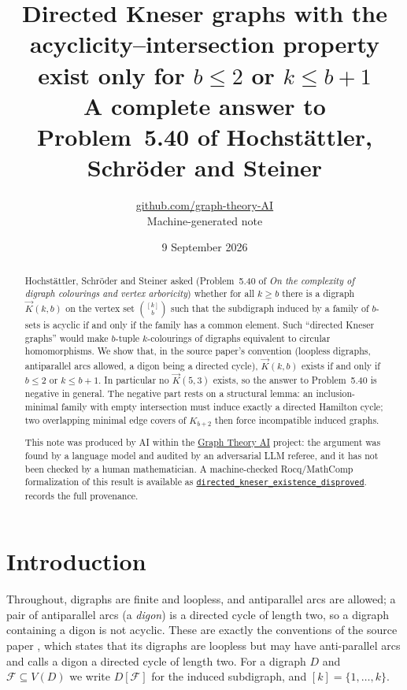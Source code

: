 \documentclass[11pt,a4paper]{article}
\title{Directed Kneser graphs with the acyclicity--intersection property\\ exist only for $b\le2$ or $k\le b+1$\\[1ex] \large A complete answer to Problem~5.40 of Hochstättler, Schröder and Steiner}
\author{\href{https://github.com/graph-theory-AI}{github.com/graph-theory-AI}\\[2pt] \normalsize Machine-generated note}
\date{9 September 2026}
\theoremstyle{plain}
\theoremstyle{definition}
\theoremstyle{remark}
\newcommand{\dK}{\vec{K}}
\newcommand{\cF}{\mathcal F}
\begin{document}
\maketitle


\begin{abstract}
Hochstättler, Schröder and Steiner asked (Problem~5.40 of \emph{On the complexity of digraph colourings and vertex arboricity}) whether for all $k\ge b$ there is a digraph $\dK(k,b)$ on the vertex set $\binom{[k]}{b}$ such that the subdigraph induced by a family of $b$-sets is acyclic if and only if the family has a common element. Such ``directed Kneser graphs'' would make $b$-tuple $k$-colourings of digraphs equivalent to circular homomorphisms. We show that, in the source paper's convention (loopless digraphs, antiparallel arcs allowed, a digon being a directed cycle), $\dK(k,b)$ exists if and only if $b\le2$ or $k\le b+1$. In particular no $\dK(5,3)$ exists, so the answer to Problem~5.40 is negative in general. The negative part rests on a structural lemma: an inclusion-minimal family with empty intersection must induce exactly a directed Hamilton cycle; two overlapping minimal edge covers of $K_{b+2}$ then force incompatible induced graphs.

\medskip\noindent\small
This note was produced by AI within the \href{https://github.com/graph-theory-AI/Graph-Theory-LLM-Proofs}{Graph Theory AI} project:
the argument was found by a language model and audited by an adversarial LLM
referee, and it has not been checked by a human mathematician.
A machine-checked Rocq/MathComp formalization of this result is available as
\href{https://github.com/LLM4Rocq/graph-theory-rocq/blob/main/digraph-theory/theories/applications/directed_kneser_nonexistence.v}{\texttt{directed\_kneser\_existence\_disproved}}.
 records the full provenance.

\end{abstract}

\section{Introduction}

Throughout, digraphs are finite and loopless, and antiparallel arcs are allowed; a pair of antiparallel arcs (a \emph{digon}) is a directed cycle of length two, so a digraph containing a digon is not acyclic. These are exactly the conventions of the source paper \cite{HSS20}, which states that its digraphs are loopless but may have anti-parallel arcs and calls a digon a directed cycle of length two. For a digraph $D$ and $\cF\subseteq V(D)$ we write $D[\cF]$ for the induced subdigraph, and $[k]=\{1,\dots,k\}$.
\end{document}
